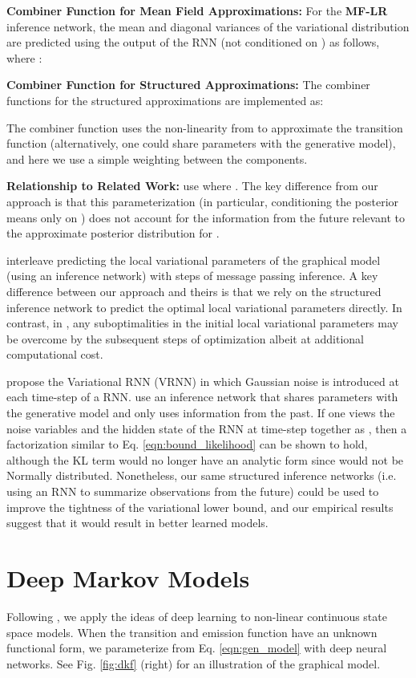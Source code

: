 \documentclass[letterpaper]{article}
\theoremstyle{plain}
\begin{document}
{\bf Combiner Function for Mean Field Approximations:}
For the \textbf{MF-LR} inference network, the mean  and
diagonal variances  of the variational distribution
 are predicted using the output of the RNN (not
conditioned on ) as follows, where :



{\bf Combiner Function for Structured Approximations:} 
The combiner functions for the structured approximations are
implemented as:

The combiner function uses the  non-linearity from  to
approximate the transition function (alternatively, one could share
parameters with the generative model), and here we use a
simple weighting between the components.


\textbf{Relationship to Related Work: }
\citeauthor{archer2015black,gao2016linear} use  where . 
The key difference from our approach is that this parameterization (in particular, conditioning the posterior means only on ) does not account for the information
from the future relevant to the approximate posterior distribution for . 

\citeauthor{johnson2016structured} 
interleave predicting the local variational parameters of the graphical model (using an inference network) with steps of message passing inference.
A key difference between our approach and theirs is that we rely on the structured inference network to predict the optimal local variational parameters
directly. In contrast, in \citeauthor{johnson2016structured}, any suboptimalities 
in the initial local variational parameters may be overcome by the subsequent steps of optimization 
albeit at additional computational cost. 

\citeauthor{chung2015recurrent} propose the Variational RNN (VRNN) in
which Gaussian noise is introduced at each time-step of a RNN.
\citeauthor{chung2015recurrent} use an inference network that shares
parameters with the generative model and only uses information from
the past. If one views the noise variables and the hidden state of the
RNN at time-step  together as , then a factorization similar
to Eq. \ref{eqn:bound_likelihood} can be shown to hold, although the
KL term would no longer have an analytic form since  would not be Normally distributed. Nonetheless, our same
structured inference networks (i.e. using an RNN to summarize
observations from the future) could be used to improve the tightness
of the variational lower bound, and our empirical results suggest that
it would result in better learned models.
 \section{Deep Markov Models}
Following \cite{Raiko2006}, we apply the ideas of deep learning to non-linear continuous state space models.
When the transition and emission function have an unknown functional form, we 
parameterize  from Eq. \ref{eqn:gen_model}
with deep neural networks. See Fig. \ref{fig:dkf} (right) for an illustration of the graphical model.  
\end{document}
